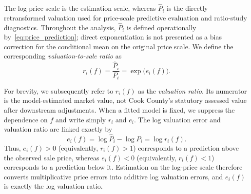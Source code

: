 \documentclass[10pt]{article}
\theoremstyle{definition}
\newcommand{\1}{\mathbf{1}}
\begin{document}
{The log-price scale is the estimation scale, whereas $\widehat{P}_i$ is the directly retransformed valuation used for price-scale predictive evaluation and ratio-study diagnostics. Throughout the analysis, $\widehat{P}_i$ is defined operationally by~\eqref{eq:price_prediction}; direct exponentiation is not presented as a bias correction for the conditional mean on the original price scale. We define the corresponding \emph{valuation-to-sale ratio} as}
\begin{equation}
\label{eq:valuation_ratio}
r_i(f)
=
\frac{\widehat{P}_i}{P_i}
=
\exp\bigl(e_i(f)\bigr).
\end{equation}



{For brevity, we subsequently refer to $r_i(f)$ as the \emph{valuation ratio}. Its numerator is the model-estimated market value, not Cook County's statutory assessed value after downstream adjustments. When a fitted model is fixed, we suppress the dependence on $f$ and write simply $r_i$ and $e_i$. The log valuation error and valuation ratio are linked exactly by}
\begin{equation}
\label{eq:log_ratio}
e_i(f)
=
\log \widehat{P}_i-\log P_i
=
\log r_i(f).
\end{equation}
Thus, $e_i(f)>0$ (equivalently, $r_i(f)>1$) corresponds to a prediction above the observed sale price, whereas $e_i(f)<0$ (equivalently, $r_i(f)<1$) corresponds to a prediction below it.
{Estimation on the log-price scale therefore converts multiplicative price errors into additive log valuation errors, and $e_i(f)$ is exactly the log valuation ratio.}
\end{document}
